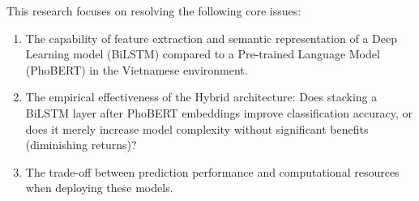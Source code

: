 \documentclass[12pt]{report} %
\begin{document}
This research focuses on resolving the following core issues:
\begin{enumerate}
    \item The capability of feature extraction and semantic representation of a Deep Learning model (BiLSTM) compared to a Pre-trained Language Model (PhoBERT) in the Vietnamese environment.
    \item The empirical effectiveness of the Hybrid architecture: Does stacking a BiLSTM layer after PhoBERT embeddings improve classification accuracy, or does it merely increase model complexity without significant benefits (diminishing returns)?
    \item The trade-off between prediction performance and computational resources when deploying these models.
\end{enumerate}
\end{document}
